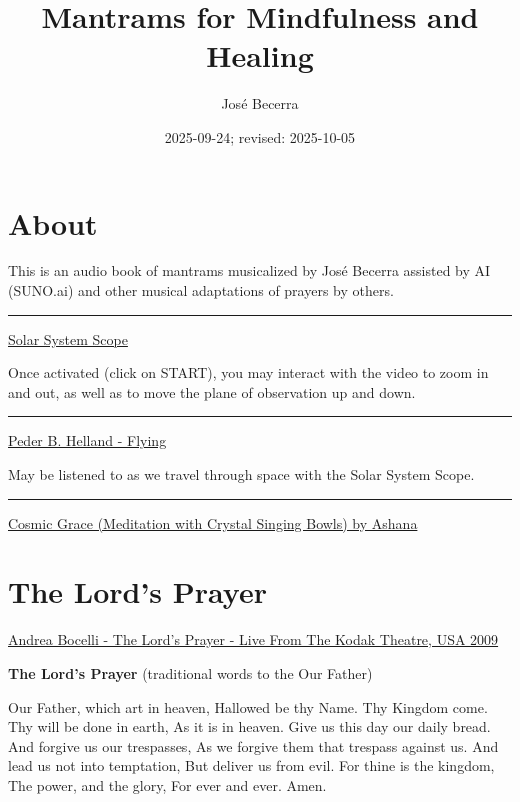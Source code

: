 \documentclass[
]{book}
\title{Mantrams for Mindfulness and Healing}
\author{José Becerra}
\date{2025-09-24; revised: 2025-10-05}
\begin{document}
\maketitle

{
\setcounter{tocdepth}{1}
\tableofcontents
}
\hypertarget{about}{%
\chapter*{About}\label{about}}

This is an audio book of mantrams musicalized by José Becerra assisted by AI (SUNO.ai) and other musical adaptations of prayers by others.

\begin{center}\rule{0.5\linewidth}{0.5pt}\end{center}

\href{https://www.solarsystemscope.com/}{Solar System Scope}

Once activated (click on START), you may interact with the video to zoom in and out, as well as to move the plane of observation up and down.

\begin{center}\rule{0.5\linewidth}{0.5pt}\end{center}

\href{https://www.youtube.com/watch?v=mBsaY0OcYpY}{Peder B. Helland - Flying}

May be listened to as we travel through space with the Solar System Scope.

\begin{center}\rule{0.5\linewidth}{0.5pt}\end{center}

\href{https://www.youtube.com/watch?v=jd6cxHNsy2U}{Cosmic Grace (Meditation with Crystal Singing Bowls) by Ashana}

\hypertarget{the-lords-prayer}{%
\chapter{The Lord's Prayer}\label{the-lords-prayer}}

\href{https://www.youtube.com/watch?v=u8jImIjg4UY}{Andrea Bocelli - The Lord's Prayer -
Live From The Kodak Theatre, USA 2009}

\textbf{The Lord's Prayer}
(traditional words to the Our Father)

Our Father, which art in heaven,
Hallowed be thy Name.
Thy Kingdom come.
Thy will be done in earth,
As it is in heaven.
Give us this day our daily bread.
And forgive us our trespasses,
As we forgive them that trespass against us.
And lead us not into temptation,
But deliver us from evil.
For thine is the kingdom,
The power, and the glory,
For ever and ever.
Amen.
\end{document}
